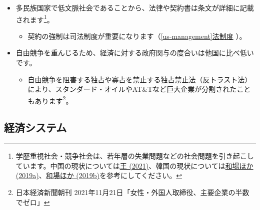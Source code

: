 \documentclass[
]{book}
\providecommand{\tightlist}{%
  \setlength{\itemsep}{0pt}\setlength{\parskip}{0pt}}
\begin{document}
\begin{itemize}
\item
  多民族国家で低文脈社会であることから、法律や契約書は条文が詳細に記載されます\footnote{学歴重視社会・競争社会は、若年層の失業問題などの社会問題を引き起こしています。中国の現状については\href{https://diamond.jp/articles/-/277433}{王 (2021)}、韓国の現状については\href{https://hbol.jp/pc/189601/}{和場ほか (2019a)}、\href{https://hbol.jp/pc/189810/}{和場ほか (2019b)}を参考にしてください。}。

  \begin{itemize}
  \tightlist
  \item
    契約の強制は司法制度が重要になります（\ref{us-management}\protect\hyperlink{law}{法制度} ）。
  \end{itemize}
\end{itemize}

\begin{itemize}
\item
  自由競争を重んじるため、経済に対する政府関与の度合いは他国に比べ低いです。

  \begin{itemize}
  \tightlist
  \item
    自由競争を阻害する独占や寡占を禁止する独占禁止法（反トラスト法）により、スタンダード・オイルやAT\&Tなど巨大企業が分割されたこともあります\footnote{日本経済新聞朝刊 2021年11月21日「女性・外国人取締役、主要企業の半数でゼロ」}。
  \end{itemize}
\end{itemize}

\hypertarget{us-economy}{%
\subsection{経済システム}\label{us-economy}}
\end{document}
